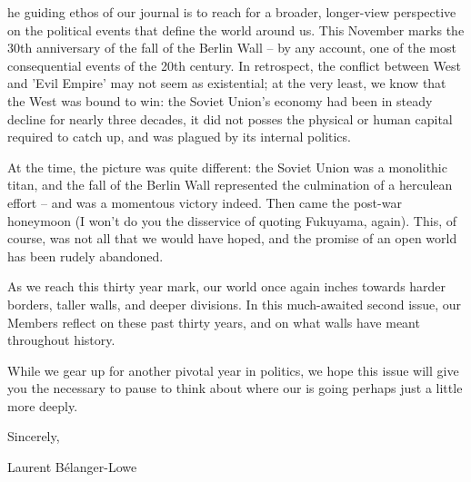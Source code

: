 

he guiding ethos of our journal is to reach for a broader, longer-view perspective on the political events that define the world around us. This November marks the 30th anniversary of the fall of the Berlin Wall -- by any account, one of the most consequential events of the 20th century. In retrospect, the conflict between West and 'Evil Empire' may not seem as existential; at the very least, we know that the West was bound to win: the Soviet Union's economy had been in steady decline for nearly three decades, it did not posses the physical or human capital required to catch up, and was plagued by its internal politics.  

At the time, the picture was quite different: the Soviet Union was a monolithic titan, and the fall of the Berlin Wall represented the culmination of a herculean effort -- and was a momentous victory indeed. Then came the post-war honeymoon (I won't do you the disservice of quoting Fukuyama, again). This, of course, was not all that we would have hoped, and the promise of an open world has been rudely abandoned. 

As we reach this thirty year mark, our world once again inches towards harder borders, taller walls, and deeper divisions. In this much-awaited second issue, our Members reflect on these past thirty years, and on what walls have meant throughout history. 

While we gear up for another pivotal year in politics, we hope this issue will give you the necessary to pause to think about where our is going perhaps just a little more deeply. 

Sincerely,

Laurent B\'elanger-Lowe